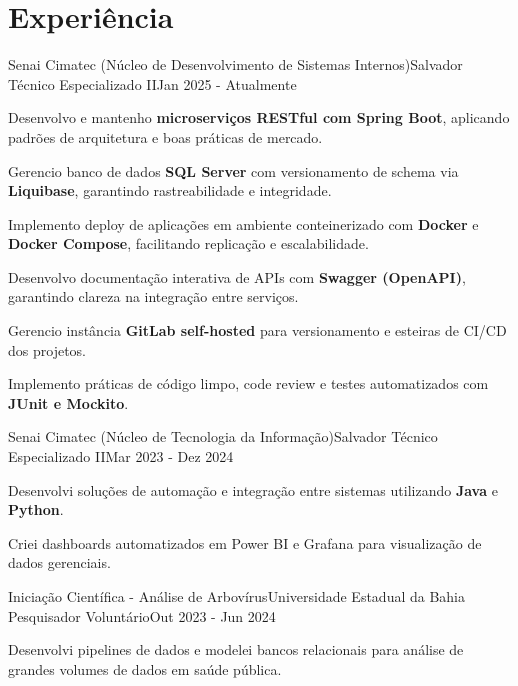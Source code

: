 \section{\textbf{Experiência}}
\resumeSubHeadingListStart
\resumeSubheading
{Senai Cimatec (Núcleo de Desenvolvimento de Sistemas Internos)}{Salvador}
{Técnico Especializado II}{Jan 2025 - Atualmente}
\vspace{-2.0mm}
\resumeItemListStart
\item {Desenvolvo e mantenho \textbf{microserviços RESTful com Spring Boot}, aplicando padrões de arquitetura e boas práticas de mercado.}
\item {Gerencio banco de dados \textbf{SQL Server} com versionamento de schema via \textbf{Liquibase}, garantindo rastreabilidade e integridade.}
\item {Implemento deploy de aplicações em ambiente conteinerizado com \textbf{Docker} e \textbf{Docker Compose}, facilitando replicação e escalabilidade.}
\item {Desenvolvo documentação interativa de APIs com \textbf{Swagger (OpenAPI)}, garantindo clareza na integração entre serviços.}
\item {Gerencio instância \textbf{GitLab self-hosted} para versionamento e esteiras de CI/CD dos projetos.}
\item {Implemento práticas de código limpo, code review e testes automatizados com \textbf{JUnit e Mockito}.}
\resumeItemListEnd

\resumeSubheading
{Senai Cimatec (Núcleo de Tecnologia da Informação)}{Salvador}
{Técnico Especializado II}{Mar 2023 - Dez 2024}
\vspace{-2.0mm}
\resumeItemListStart
\item {Desenvolvi soluções de automação e integração entre sistemas utilizando \textbf{Java} e \textbf{Python}.}
\item {Criei dashboards automatizados em Power BI e Grafana para visualização de dados gerenciais.}
\resumeItemListEnd

\resumeSubheading
{Iniciação Científica - Análise de Arbovírus}{Universidade Estadual da Bahia}
{Pesquisador Voluntário}{Out 2023 - Jun 2024}
\vspace{-2.0mm}
\resumeItemListStart
\item {Desenvolvi pipelines de dados e modelei bancos relacionais para análise de grandes volumes de dados em saúde pública.}
\resumeItemListEnd

\resumeSubHeadingListEnd
\vspace{-8.5mm}

